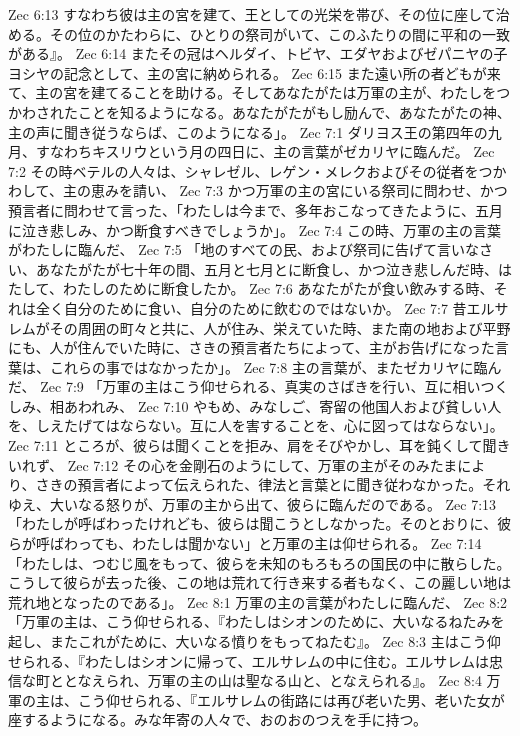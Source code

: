 Zec 6:13  すなわち彼は主の宮を建て、王としての光栄を帯び、その位に座して治める。その位のかたわらに、ひとりの祭司がいて、このふたりの間に平和の一致がある』。
Zec 6:14  またその冠はヘルダイ、トビヤ、エダヤおよびゼパニヤの子ヨシヤの記念として、主の宮に納められる。
Zec 6:15  また遠い所の者どもが来て、主の宮を建てることを助ける。そしてあなたがたは万軍の主が、わたしをつかわされたことを知るようになる。あなたがたがもし励んで、あなたがたの神、主の声に聞き従うならば、このようになる」。
Zec 7:1  ダリヨス王の第四年の九月、すなわちキスリウという月の四日に、主の言葉がゼカリヤに臨んだ。
Zec 7:2  その時ベテルの人々は、シャレゼル、レゲン・メレクおよびその従者をつかわして、主の恵みを請い、
Zec 7:3  かつ万軍の主の宮にいる祭司に問わせ、かつ預言者に問わせて言った、「わたしは今まで、多年おこなってきたように、五月に泣き悲しみ、かつ断食すべきでしょうか」。
Zec 7:4  この時、万軍の主の言葉がわたしに臨んだ、
Zec 7:5  「地のすべての民、および祭司に告げて言いなさい、あなたがたが七十年の間、五月と七月とに断食し、かつ泣き悲しんだ時、はたして、わたしのために断食したか。
Zec 7:6  あなたがたが食い飲みする時、それは全く自分のために食い、自分のために飲むのではないか。
Zec 7:7  昔エルサレムがその周囲の町々と共に、人が住み、栄えていた時、また南の地および平野にも、人が住んでいた時に、さきの預言者たちによって、主がお告げになった言葉は、これらの事ではなかったか」。
Zec 7:8  主の言葉が、またゼカリヤに臨んだ、
Zec 7:9  「万軍の主はこう仰せられる、真実のさばきを行い、互に相いつくしみ、相あわれみ、
Zec 7:10  やもめ、みなしご、寄留の他国人および貧しい人を、しえたげてはならない。互に人を害することを、心に図ってはならない」。
Zec 7:11  ところが、彼らは聞くことを拒み、肩をそびやかし、耳を鈍くして聞きいれず、
Zec 7:12  その心を金剛石のようにして、万軍の主がそのみたまにより、さきの預言者によって伝えられた、律法と言葉とに聞き従わなかった。それゆえ、大いなる怒りが、万軍の主から出て、彼らに臨んだのである。
Zec 7:13  「わたしが呼ばわったけれども、彼らは聞こうとしなかった。そのとおりに、彼らが呼ばわっても、わたしは聞かない」と万軍の主は仰せられる。
Zec 7:14  「わたしは、つむじ風をもって、彼らを未知のもろもろの国民の中に散らした。こうして彼らが去った後、この地は荒れて行き来する者もなく、この麗しい地は荒れ地となったのである」。
Zec 8:1  万軍の主の言葉がわたしに臨んだ、
Zec 8:2  「万軍の主は、こう仰せられる、『わたしはシオンのために、大いなるねたみを起し、またこれがために、大いなる憤りをもってねたむ』。
Zec 8:3  主はこう仰せられる、『わたしはシオンに帰って、エルサレムの中に住む。エルサレムは忠信な町ととなえられ、万軍の主の山は聖なる山と、となえられる』。
Zec 8:4  万軍の主は、こう仰せられる、『エルサレムの街路には再び老いた男、老いた女が座するようになる。みな年寄の人々で、おのおのつえを手に持つ。
